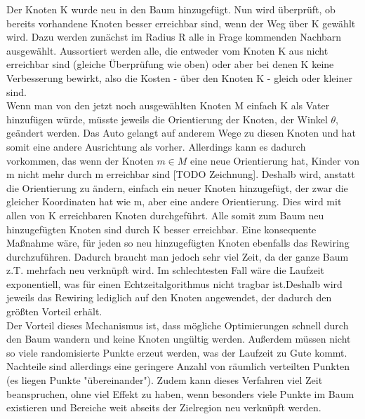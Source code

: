 Der Knoten K wurde neu in den Baum hinzugefügt. Nun wird überprüft, ob bereits vorhandene Knoten besser erreichbar sind, wenn der Weg über K gewählt wird.
Dazu werden zunächst im Radius R alle in Frage kommenden Nachbarn ausgewählt. Aussortiert werden alle, die entweder vom Knoten K aus nicht erreichbar sind (gleiche Überprüfung wie oben) oder aber bei denen K keine Verbesserung bewirkt, also die Kosten - über den Knoten K - gleich oder kleiner sind. \\
Wenn man von den jetzt noch ausgewählten Knoten M einfach K als Vater hinzufügen würde, müsste jeweils die Orientierung der Knoten, der Winkel $\theta$, geändert werden. Das Auto gelangt auf anderem Wege zu diesen Knoten und hat somit eine andere Ausrichtung als vorher. Allerdings kann es dadurch vorkommen, das wenn der Knoten $m \in M$ eine neue Orientierung hat, Kinder von m nicht mehr durch m erreichbar sind [TODO Zeichnung]. Deshalb wird, anstatt die Orientierung zu ändern, einfach ein neuer Knoten hinzugefügt, der zwar die gleicher Koordinaten hat wie m, aber eine andere Orientierung. Dies wird mit allen von K erreichbaren Knoten durchgeführt. Alle somit zum Baum neu hinzugefügten Knoten sind durch K besser erreichbar. Eine konsequente Maßnahme wäre, für jeden so neu hinzugefügten Knoten ebenfalls das Rewiring durchzuführen. Dadurch braucht man jedoch sehr viel Zeit, da der ganze Baum z.T. mehrfach neu verknüpft wird. Im schlechtesten Fall wäre die Laufzeit exponentiell, was für einen Echtzeitalgorithmus nicht tragbar ist.Deshalb wird jeweils das Rewiring lediglich auf den Knoten angewendet, der dadurch den größten Vorteil erhält. \\
Der Vorteil dieses Mechanismus ist, dass mögliche Optimierungen schnell durch den Baum wandern und keine Knoten ungültig werden. Außerdem müssen nicht so viele randomisierte Punkte erzeut werden, was der Laufzeit zu Gute kommt. Nachteile sind allerdings eine geringere Anzahl von räumlich verteilten Punkten (es liegen Punkte "übereinander"). Zudem kann dieses Verfahren viel Zeit beanspruchen, ohne viel Effekt zu haben, wenn besonders viele Punkte im Baum existieren und Bereiche weit abseits der Zielregion neu verknüpft werden.


